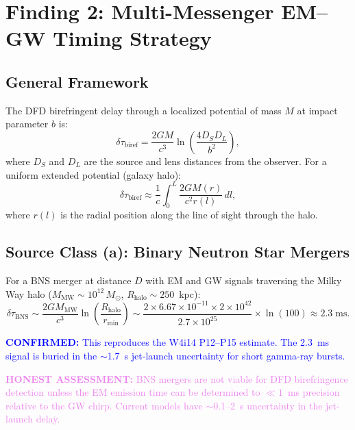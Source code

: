 \documentclass[11pt]{article}
\theoremstyle{definition}
\theoremstyle{remark}
\newcommand{\ee}[1]{\times10^{#1}}
\newcommand{\Msun}{M_\odot}
\newcommand{\confirmed}[1]{\textcolor{blue}{\textbf{CONFIRMED:} #1}}
\newcommand{\honest}[1]{\textcolor{violet}{\textbf{HONEST ASSESSMENT:} #1}}
\begin{document}
\section{Finding 2: Multi-Messenger EM--GW Timing Strategy}
\label{sec:multimessenger}

\subsection{General Framework}

The DFD birefringent delay through a localized potential of mass $M$
at impact parameter $b$ is:
\begin{equation}
\delta\tau_{\mathrm{biref}} = \frac{2GM}{c^3}\ln\left(\frac{4D_S D_L}
{b^2}\right),
\label{eq:biref-general}
\end{equation}
where $D_S$ and $D_L$ are the source and lens distances from the
observer. For a uniform extended potential (galaxy halo):
\begin{equation}
\delta\tau_{\mathrm{biref}} \approx \frac{1}{c}\int_0^L
\frac{2GM(r)}{c^2 r(l)}\,dl,
\label{eq:biref-halo}
\end{equation}
where $r(l)$ is the radial position along the line of sight through
the halo.

\subsection{Source Class (a): Binary Neutron Star Mergers}

For a BNS merger at distance $D$ with EM and GW signals traversing
the Milky Way halo ($M_{\mathrm{MW}} \sim 10^{12}\,\Msun$,
$R_{\mathrm{halo}} \sim 250$~kpc):
\begin{equation}
\delta\tau_{\mathrm{BNS}} \sim \frac{2G M_{\mathrm{MW}}}{c^3}
\ln\left(\frac{R_{\mathrm{halo}}}{r_{\min}}\right)
\sim \frac{2 \times 6.67\ee{-11} \times 2\ee{42}}{2.7\ee{25}}
\times \ln(100) \approx 2.3\;\mathrm{ms}.
\end{equation}

\confirmed{This reproduces the W4i14 P12--P15 estimate. The 2.3~ms
signal is buried in the $\sim$1.7~s jet-launch uncertainty for short
gamma-ray bursts.}

\honest{BNS mergers are not viable for DFD birefringence detection
unless the EM emission time can be determined to $\ll 1$~ms precision
relative to the GW chirp. Current models have $\sim$0.1--2~s
uncertainty in the jet-launch delay.}
\end{document}
